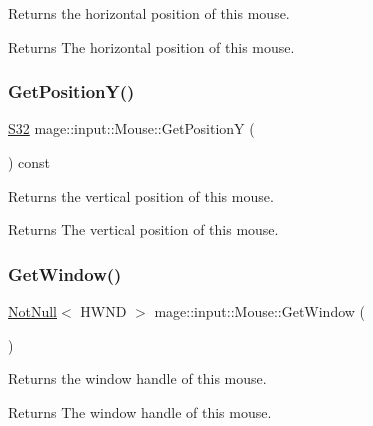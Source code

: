 Returns the horizontal position of this mouse.

\begin{DoxyReturn}{Returns}
The horizontal position of this mouse. 
\end{DoxyReturn}
\hypertarget{classmage_1_1input_1_1_mouse_a81bf0ebd5fb34a25ba9f5d4c7aea1ed6}{}\label{classmage_1_1input_1_1_mouse_a81bf0ebd5fb34a25ba9f5d4c7aea1ed6} 
\subsubsection{\texorpdfstring{Get\+Position\+Y()}{GetPositionY()}}
{\footnotesize\ttfamily \hyperlink{namespacemage_a642e05c5c83642b6946703615cdbf2da}{S32} mage\+::input\+::\+Mouse\+::\+Get\+PositionY (\begin{DoxyParamCaption}{ }\end{DoxyParamCaption}) const\hspace{0.3cm}{\ttfamily [noexcept]}}

Returns the vertical position of this mouse.

\begin{DoxyReturn}{Returns}
The vertical position of this mouse. 
\end{DoxyReturn}
\hypertarget{classmage_1_1input_1_1_mouse_a5fd893af2aede58106b718448e7e0dde}{}\label{classmage_1_1input_1_1_mouse_a5fd893af2aede58106b718448e7e0dde} 
\subsubsection{\texorpdfstring{Get\+Window()}{GetWindow()}}
{\footnotesize\ttfamily \hyperlink{namespacemage_a8769f9d670d6b585ea306cb1062af94b}{Not\+Null}$<$ H\+W\+ND $>$ mage\+::input\+::\+Mouse\+::\+Get\+Window (\begin{DoxyParamCaption}{ }\end{DoxyParamCaption})\hspace{0.3cm}{\ttfamily [noexcept]}}

Returns the window handle of this mouse.

\begin{DoxyReturn}{Returns}
The window handle of this mouse. 
\end{DoxyReturn}
\hypertarget{classmage_1_1input_1_1_mouse_af4ce64a7808af28c80bc9c01c83f7d14}{}\label{classmage_1_1input_1_1_mouse_af4ce64a7808af28c80bc9c01c83f7d14} 
